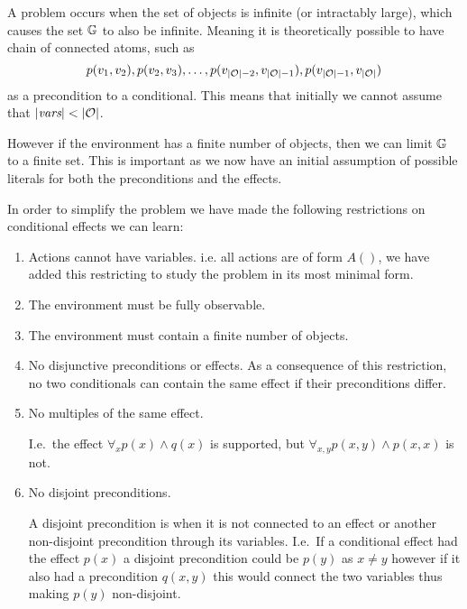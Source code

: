 \documentclass[\master/Master.tex]{subfiles}
\begin{document}
A problem occurs when the set of objects \objs is infinite (or intractably large), which causes the set $\mathbb{G}$ to also be infinite.
Meaning it is theoretically possible to have chain of connected atoms, such as 
\begin{equation*}
	p(v_1,v_2), p(v_2,v_3),\dots, p(v_{|\mathcal{O}|-2},v_{|\mathcal{O}|-1}), p(v_{|\mathcal{O}|-1},v_{|\mathcal{O}|})
\end{equation*}
 as a precondition to a conditional.
This means that initially we cannot assume that $|\textit{vars}| < |\mathcal{O}|$.

However if the environment has a finite number of objects, then we can limit $\mathbb{G}$ to a finite set.
This is important as we now have an initial assumption of possible literals for both the preconditions and the effects.

In order to simplify the problem we have made the following restrictions on conditional effects we can learn:
\begin{enumerate}[label=R\arabic*]
	\item Actions cannot have variables. i.e. all actions are of form $A()$, 
	we have added this restricting to study the problem in its most minimal form.	
		
	\item The environment must be fully observable.
	\item The environment must contain a finite number of objects.
	\item \label{rst:ca:no-disjuntive-conditionals} No disjunctive preconditions or effects. As a consequence of this restriction, no two conditionals can contain the same effect if their preconditions differ.
	\item \label{rst:ca:no-multiple-effect} No multiples of the same effect.

		  I.e.\ the effect $\forall_x p(x) \land q(x)$ is supported, but $\forall_{x, y} p(x, y) \land p(x, x) $ is not.

	\item \label{rst:ca:no-disjoint-preconditions} No disjoint preconditions.

		  A disjoint precondition is when it is not connected to an effect or another non-disjoint precondition through its variables.
		  I.e.\ If a conditional effect had the effect $p(x)$ a disjoint precondition could be $p(y)$ as $x \neq y$ however if it also had a precondition $q(x,y)$ this would connect the two variables thus making $p(y)$ non-disjoint.
\end{enumerate}
\end{document}
